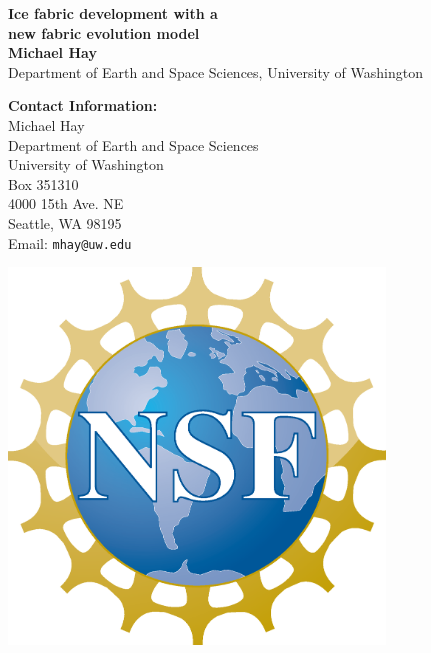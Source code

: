 \documentclass[a0,landscape]{a0poster}
\begin{document}


\begin{minipage}[b]{0.55\linewidth}
\veryHuge \color{NavyBlue} \textbf{Ice fabric development with a  \\ new fabric evolution model} \color{Black}\\ %
\huge \textbf{Michael Hay}\\ %
\huge Department of Earth and Space Sciences, University of Washington\\ %
\end{minipage}
%
\begin{minipage}[b]{0.25\linewidth}
\color{DarkSlateGray}\Large \textbf{Contact Information:}\\
Michael Hay\\
Department of Earth and Space Sciences\\
University of Washington\\
Box 351310\\
4000 15th Ave. NE\\
Seattle, WA 98195\\
Email: \texttt{mhay@uw.edu}\\ %
\end{minipage}
%
\begin{minipage}[b]{0.19\linewidth}
\includegraphics[width=10cm]{nsf1.eps} %
\end{minipage}
\end{document}
